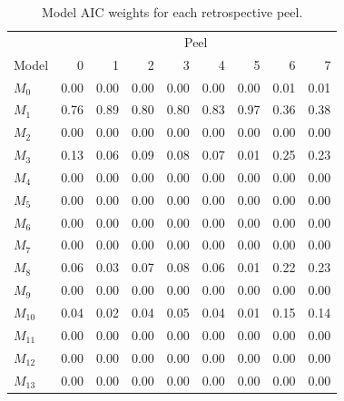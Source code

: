 \documentclass[
]{article}
\begin{document}
\begin{table}

\caption{\label{tab:aic-wts-table}Model AIC weights for each retrospective peel.}
\centering
\begin{tabular}[t]{lrrrrrrrr}
\toprule
\multicolumn{1}{c}{ } & \multicolumn{8}{c}{Peel} \\
\cmidrule(l{3pt}r{3pt}){2-9}
Model & 0 & 1 & 2 & 3 & 4 & 5 & 6 & 7\\
\midrule
$M_{0}$ & 0.00 & 0.00 & 0.00 & 0.00 & 0.00 & 0.00 & 0.01 & 0.01\\
$M_{1}$ & 0.76 & 0.89 & 0.80 & 0.80 & 0.83 & 0.97 & 0.36 & 0.38\\
$M_{2}$ & 0.00 & 0.00 & 0.00 & 0.00 & 0.00 & 0.00 & 0.00 & 0.00\\
$M_{3}$ & 0.13 & 0.06 & 0.09 & 0.08 & 0.07 & 0.01 & 0.25 & 0.23\\
$M_{4}$ & 0.00 & 0.00 & 0.00 & 0.00 & 0.00 & 0.00 & 0.00 & 0.00\\
\addlinespace
$M_{5}$ & 0.00 & 0.00 & 0.00 & 0.00 & 0.00 & 0.00 & 0.00 & 0.00\\
$M_{6}$ & 0.00 & 0.00 & 0.00 & 0.00 & 0.00 & 0.00 & 0.00 & 0.00\\
$M_{7}$ & 0.00 & 0.00 & 0.00 & 0.00 & 0.00 & 0.00 & 0.00 & 0.00\\
$M_{8}$ & 0.06 & 0.03 & 0.07 & 0.08 & 0.06 & 0.01 & 0.22 & 0.23\\
$M_{9}$ & 0.00 & 0.00 & 0.00 & 0.00 & 0.00 & 0.00 & 0.00 & 0.00\\
\addlinespace
$M_{10}$ & 0.04 & 0.02 & 0.04 & 0.05 & 0.04 & 0.01 & 0.15 & 0.14\\
$M_{11}$ & 0.00 & 0.00 & 0.00 & 0.00 & 0.00 & 0.00 & 0.00 & 0.00\\
$M_{12}$ & 0.00 & 0.00 & 0.00 & 0.00 & 0.00 & 0.00 & 0.00 & 0.00\\
$M_{13}$ & 0.00 & 0.00 & 0.00 & 0.00 & 0.00 & 0.00 & 0.00 & 0.00\\
\bottomrule
\end{tabular}
\end{table}
\end{document}
